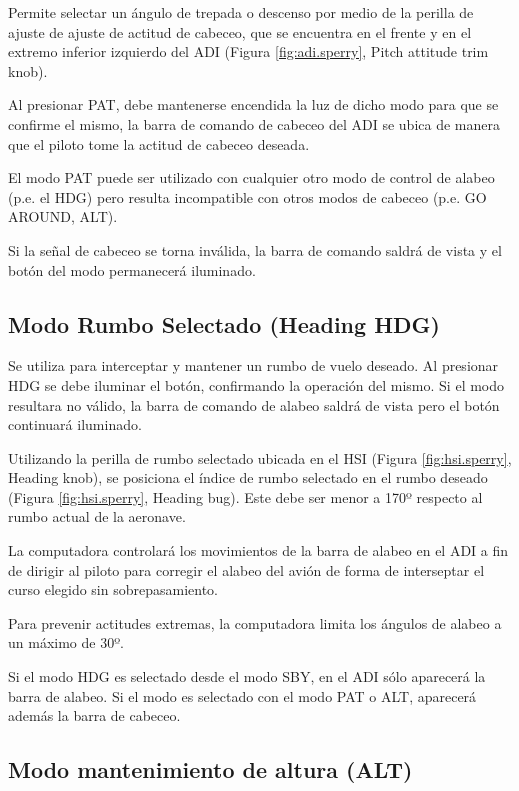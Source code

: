 \documentclass[a4paper,12pt,twoside]{article}
\begin{document}
Permite selectar un \'angulo de trepada o descenso por medio de la perilla
de ajuste de ajuste de actitud de cabeceo, que se encuentra en el frente y
en el extremo inferior izquierdo
del ADI (Figura \ref{fig:adi.sperry}, Pitch attitude trim knob).

Al presionar PAT, debe mantenerse encendida la luz de dicho modo
para que se confirme el mismo, la barra de comando de cabeceo del
ADI se ubica de manera que el piloto tome la actitud de cabeceo
deseada.

El modo PAT puede ser utilizado con cualquier otro modo de 
control de alabeo (p.e. el HDG) pero
resulta incompatible con otros modos de cabeceo (p.e. GO AROUND, ALT).

Si la se\~nal de cabeceo se torna inv\'alida, la barra de comando saldr\'a 
de vista y el bot\'on del modo permanecer\'a iluminado.

\subsection{Modo Rumbo Selectado (Heading HDG)}
\label{sec:hdg}

Se utiliza para interceptar y mantener un rumbo de vuelo deseado.
Al presionar HDG se debe iluminar el bot\'on, confirmando la
operaci\'on del mismo.
Si el modo resultara no v\'alido, la barra de comando de alabeo
saldr\'a de vista pero el bot\'on continuar\'a iluminado.

Utilizando la perilla de rumbo selectado ubicada en  el
HSI (Figura \ref{fig:hsi.sperry}, Heading knob),
se posiciona el \'indice de rumbo selectado en el rumbo
deseado 
(Figura \ref{fig:hsi.sperry}, Heading bug). 
Este debe ser menor a 170º respecto al rumbo actual de la aeronave.

La computadora controlar\'a los movimientos de la barra de
alabeo en el ADI a fin de dirigir al piloto para corregir
el alabeo del avi\'on de forma de interseptar el curso elegido
sin sobrepasamiento.

Para prevenir actitudes extremas, la computadora limita los \'angulos
de alabeo a un m\'aximo de 30º.

Si el modo HDG es selectado desde el modo SBY, en el ADI s\'olo
aparecer\'a la barra de alabeo. 
Si el modo es selectado con el modo PAT o ALT, aparecer\'a adem\'as
la barra de cabeceo.

\subsection{Modo mantenimiento de altura (ALT)}
\label{sec:alt}
\end{document}

